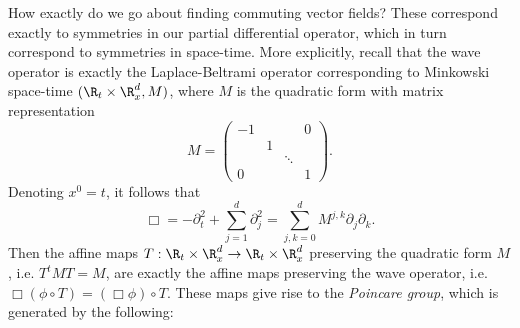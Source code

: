 How exactly do we go about finding commuting vector fields? These correspond exactly to symmetries in our partial differential operator, which in turn correspond to symmetries in space-time. More explicitly, recall that the wave operator is exactly the Laplace-Beltrami operator corresponding to Minkowski space-time $(\R_t \times \R^d_x, M)$, where $M$ is the quadratic form with matrix representation
	\[ 
		M 
		=
		\begin{pmatrix}
			-1	& 		& 			&0 \\
				& 1	&			&  \\
				&		&\ddots 	&  \\
			0	&		& 			&1
		\end{pmatrix}.
	\]
Denoting $x^0 = t$, it follows that 
	\[ \Box = -\partial_t^2 + \sum_{j = 1}^d \partial_j^2 = \sum_{j, k = 0}^d M^{j, k} \partial_j \partial_k. \]	
Then the affine maps $T: \R_t \times \R^d_x \to \R_t \times \R^d_x$ preserving the quadratic form $M$, i.e. $T^t M T = M$, are exactly the affine maps preserving the wave operator, i.e. $\Box (\phi \circ T) = (\Box \phi) \circ T$. These maps give rise to the \emph{Poincare group}, which is generated by the following:
